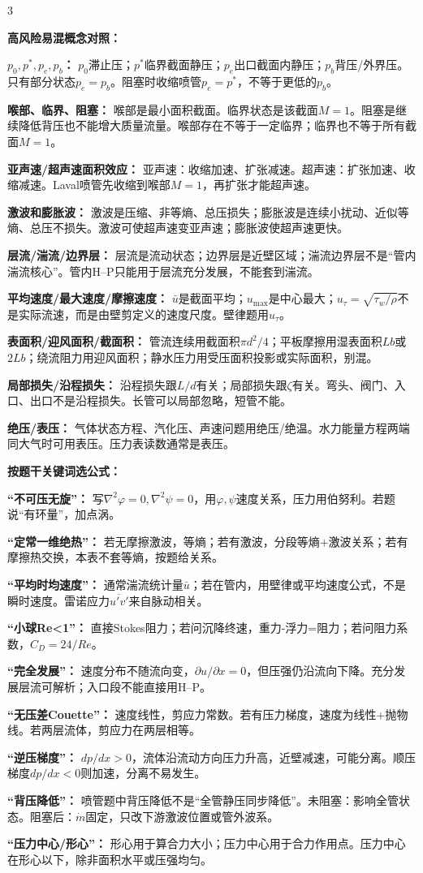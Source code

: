 \documentclass[a4paper]{article}
\newcommand{\sect}[1]{\par{\bfseries\color{Q}#1：}}
\begin{document}
\begin{multicols}{3}
{\sect{高风险易混概念对照}
\sect{$p_0,p^*,p_e,p_b$}
$p_0$滞止压；$p^*$临界截面静压；$p_e$出口截面内静压；$p_b$背压/外界压。只有部分状态$p_e=p_b$。阻塞时收缩喷管$p_e=p^*$，不等于更低的$p_b$。
\sect{喉部、临界、阻塞}
喉部是最小面积截面。临界状态是该截面$M=1$。阻塞是继续降低背压也不能增大质量流量。喉部存在不等于一定临界；临界也不等于所有截面$M=1$。
\sect{亚声速/超声速面积效应}
亚声速：收缩加速、扩张减速。超声速：扩张加速、收缩减速。Laval喷管先收缩到喉部$M=1$，再扩张才能超声速。
\sect{激波和膨胀波}
激波是压缩、非等熵、总压损失；膨胀波是连续小扰动、近似等熵、总压不损失。激波可使超声速变亚声速；膨胀波使超声速更快。
\sect{层流/湍流/边界层}
层流是流动状态；边界层是近壁区域；湍流边界层不是“管内湍流核心”。管内H--P只能用于层流充分发展，不能套到湍流。
\sect{平均速度/最大速度/摩擦速度}
$\bar u$是截面平均；$u_{\max}$是中心最大；$u_\tau=\sqrt{\tau_w/\rho}$不是实际流速，而是由壁剪定义的速度尺度。壁律题用$u_\tau$。
\sect{表面积/迎风面积/截面积}
管流连续用截面积$\pi d^2/4$；平板摩擦用湿表面积$Lb$或$2Lb$；绕流阻力用迎风面积；静水压力用受压面积投影或实际面积，别混。
\sect{局部损失/沿程损失}
沿程损失跟$L/d$有关；局部损失跟$\zeta$有关。弯头、阀门、入口、出口不是沿程损失。长管可以局部忽略，短管不能。
\sect{绝压/表压}
气体状态方程、汽化压、声速问题用绝压/绝温。水力能量方程两端同大气时可用表压。压力表读数通常是表压。

\sect{按题干关键词选公式}
\sect{“不可压无旋”}
写$\nabla^2\varphi=0,\nabla^2\psi=0$，用$\varphi,\psi$速度关系，压力用伯努利。若题说“有环量”，加点涡。
\sect{“定常一维绝热”}
若无摩擦激波，等熵；若有激波，分段等熵+激波关系；若有摩擦热交换，本表不套等熵，按题给关系。
\sect{“平均时均速度”}
通常湍流统计量$\bar u$；若在管内，用壁律或平均速度公式，不是瞬时速度。雷诺应力$\overline{u'v'}$来自脉动相关。
\sect{“小球Re<1”}
直接Stokes阻力；若问沉降终速，重力-浮力=阻力；若问阻力系数，$C_D=24/Re$。
\sect{“完全发展”}
速度分布不随流向变，$\partial u/\partial x=0$，但压强仍沿流向下降。充分发展层流可解析；入口段不能直接用H--P。
\sect{“无压差Couette”}
速度线性，剪应力常数。若有压力梯度，速度为线性+抛物线。若两层流体，剪应力在两层相等。
\sect{“逆压梯度”}
$dp/dx>0$，流体沿流动方向压力升高，近壁减速，可能分离。顺压梯度$dp/dx<0$则加速，分离不易发生。
\sect{“背压降低”}
喷管题中背压降低不是“全管静压同步降低”。未阻塞：影响全管状态。阻塞后：$\dot m$固定，只改下游激波位置或管外波系。
\sect{“压力中心/形心”}
形心用于算合力大小；压力中心用于合力作用点。压力中心在形心以下，除非面积水平或压强均匀。

}
\end{multicols}
\end{document}
